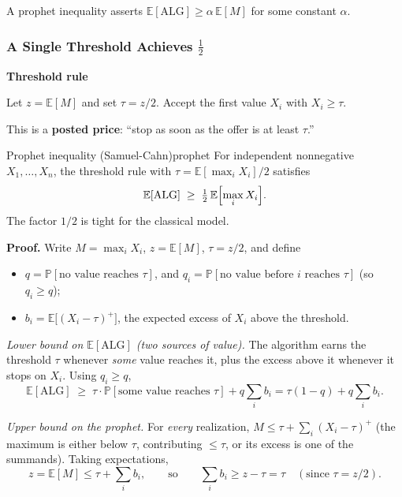 A prophet inequality asserts $\mathbb{E}[\mathrm{ALG}] \ge \alpha\,\mathbb{E}[M]$ for some constant $\alpha$.

\subsubsection{A Single Threshold Achieves $\tfrac12$}

\begin{mdframed}[backgroundcolor=lightblue, linecolor=keyblue, linewidth=1pt]
\textbf{Threshold rule}

Let $z = \mathbb{E}[M]$ and set $\tau = z/2$. Accept the first value $X_i$ with $X_i \ge \tau$.
\end{mdframed}

This is a \textbf{posted price}: ``stop as soon as the offer is at least $\tau$.''

\begin{theorem}{Prophet inequality (Samuel-Cahn)}{prophet}
For independent nonnegative $X_1, \dots, X_n$, the threshold rule with $\tau = \mathbb{E}[\max_i X_i]/2$ satisfies
\[
\mathbb{E}[\mathrm{ALG}] \;\ge\; \tfrac12\,\mathbb{E}\Bigl[\max_i X_i\Bigr].
\]
The factor $1/2$ is tight for the classical model.
\end{theorem}

\textbf{Proof.} Write $M = \max_i X_i$, $z = \mathbb{E}[M]$, $\tau = z/2$, and define
\begin{itemize}
  \item $q = \mathbb{P}[\text{no value reaches } \tau]$, and $q_i = \mathbb{P}[\text{no value before } i \text{ reaches } \tau]$ (so $q_i \ge q$);
  \item $b_i = \mathbb{E}\bigl[(X_i - \tau)^+\bigr]$, the expected excess of $X_i$ above the threshold.
\end{itemize}

\emph{Lower bound on $\mathbb{E}[\mathrm{ALG}]$ (two sources of value).} The algorithm earns the threshold $\tau$ whenever \emph{some} value reaches it, plus the excess above it whenever it stops on $X_i$. Using $q_i \ge q$,
\[
\mathbb{E}[\mathrm{ALG}] \;\ge\; \tau\cdot\mathbb{P}[\text{some value reaches }\tau] + q\sum_i b_i = \tau(1-q) + q\sum_i b_i.
\]

\emph{Upper bound on the prophet.} For \emph{every} realization, $M \le \tau + \sum_i (X_i - \tau)^+$ (the maximum is either below $\tau$, contributing $\le \tau$, or its excess is one of the summands). Taking expectations,
\[
z = \mathbb{E}[M] \le \tau + \sum_i b_i,
\qquad\text{so}\qquad \sum_i b_i \ge z - \tau = \tau \quad(\text{since } \tau = z/2).
\]

